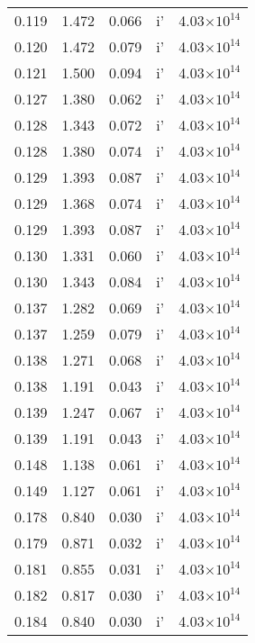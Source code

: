 \documentclass{aa}
\begin{document}
{\begin{longtable}{c|c|c|c|c}
  0.119 &   1.472 &  0.066 & i'        &  4.03$\times 10^{14}$    \\
  0.120 &   1.472 &  0.079 & i'        &  4.03$\times 10^{14}$    \\
  0.121 &   1.500 &  0.094 & i'        &  4.03$\times 10^{14}$    \\
  0.127 &   1.380 &  0.062 & i'        &  4.03$\times 10^{14}$    \\
  0.128 &   1.343 &  0.072 & i'        &  4.03$\times 10^{14}$    \\
  0.128 &   1.380 &  0.074 & i'        &  4.03$\times 10^{14}$    \\
  0.129 &   1.393 &  0.087 & i'        &  4.03$\times 10^{14}$    \\
  0.129 &   1.368 &  0.074 & i'        &  4.03$\times 10^{14}$    \\
  0.129 &   1.393 &  0.087 & i'        &  4.03$\times 10^{14}$    \\
  0.130 &   1.331 &  0.060 & i'        &  4.03$\times 10^{14}$    \\
  0.130 &   1.343 &  0.084 & i'        &  4.03$\times 10^{14}$    \\
  0.137 &   1.282 &  0.069 & i'        &  4.03$\times 10^{14}$    \\
  0.137 &   1.259 &  0.079 & i'        &  4.03$\times 10^{14}$    \\
  0.138 &   1.271 &  0.068 & i'        &  4.03$\times 10^{14}$    \\
  0.138 &   1.191 &  0.043 & i'        &  4.03$\times 10^{14}$    \\
  0.139 &   1.247 &  0.067 & i'        &  4.03$\times 10^{14}$    \\
  0.139 &   1.191 &  0.043 & i'        &  4.03$\times 10^{14}$    \\
  0.148 &   1.138 &  0.061 & i'        &  4.03$\times 10^{14}$    \\
  0.149 &   1.127 &  0.061 & i'        &  4.03$\times 10^{14}$    \\
  0.178 &   0.840 &  0.030 & i'        &  4.03$\times 10^{14}$    \\
  0.179 &   0.871 &  0.032 & i'        &  4.03$\times 10^{14}$    \\
  0.181 &   0.855 &  0.031 & i'        &  4.03$\times 10^{14}$    \\
  0.182 &   0.817 &  0.030 & i'        &  4.03$\times 10^{14}$    \\
  0.184 &   0.840 &  0.030 & i'        &  4.03$\times 10^{14}$    \\

\end{longtable}}
\end{document}
